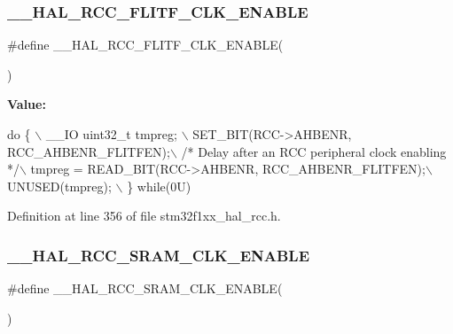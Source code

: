 \subsubsection{\texorpdfstring{\+\_\+\+\_\+\+H\+A\+L\+\_\+\+R\+C\+C\+\_\+\+F\+L\+I\+T\+F\+\_\+\+C\+L\+K\+\_\+\+E\+N\+A\+B\+LE}{\_\_HAL\_RCC\_FLITF\_CLK\_ENABLE}}
{\footnotesize\ttfamily \#define \+\_\+\+\_\+\+H\+A\+L\+\_\+\+R\+C\+C\+\_\+\+F\+L\+I\+T\+F\+\_\+\+C\+L\+K\+\_\+\+E\+N\+A\+B\+LE(\begin{DoxyParamCaption}{ }\end{DoxyParamCaption})}

{\bfseries Value\+:}
\begin{DoxyCode}
\textcolor{keywordflow}{do} \{ \(\backslash\)
                                        \_\_IO uint32\_t tmpreg; \(\backslash\)
                                        SET\_BIT(RCC->AHBENR, RCC\_AHBENR\_FLITFEN);\(\backslash\)
                                        \textcolor{comment}{/* Delay after an RCC peripheral clock enabling */}\(\backslash\)
                                        tmpreg = READ\_BIT(RCC->AHBENR, RCC\_AHBENR\_FLITFEN);\(\backslash\)
                                        UNUSED(tmpreg); \(\backslash\)
                                      \} \textcolor{keywordflow}{while}(0U)
\end{DoxyCode}


Definition at line 356 of file stm32f1xx\+\_\+hal\+\_\+rcc.\+h.

\mbox{\label{group___r_c_c___peripheral___clock___enable___disable_ga93ba92ddc3fa1efc4d840a19795b6888}} 
\subsubsection{\texorpdfstring{\+\_\+\+\_\+\+H\+A\+L\+\_\+\+R\+C\+C\+\_\+\+S\+R\+A\+M\+\_\+\+C\+L\+K\+\_\+\+E\+N\+A\+B\+LE}{\_\_HAL\_RCC\_SRAM\_CLK\_ENABLE}}
{\footnotesize\ttfamily \#define \+\_\+\+\_\+\+H\+A\+L\+\_\+\+R\+C\+C\+\_\+\+S\+R\+A\+M\+\_\+\+C\+L\+K\+\_\+\+E\+N\+A\+B\+LE(\begin{DoxyParamCaption}{ }\end{DoxyParamCaption})}

